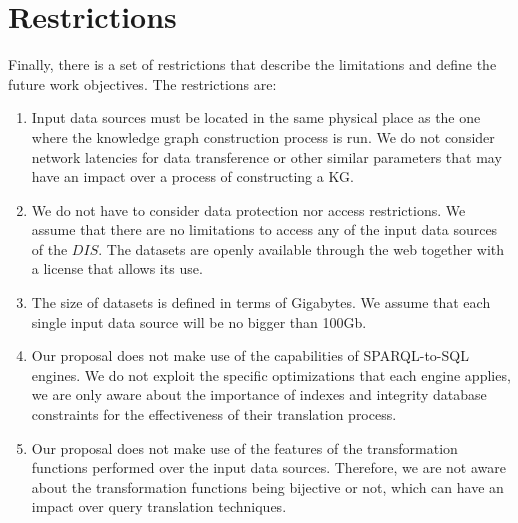 \section{Restrictions}
Finally, there is a set of restrictions that describe the limitations and define the future work objectives. The restrictions are:

\begin{enumerate}[label=\textbf{R{\arabic*}}]
    \item Input data sources must be located in the same physical place as the one where the knowledge graph construction process is run. We do not consider network latencies for data transference or other similar parameters that may have an impact over a process of constructing a KG. 
    \item We do not have to consider data protection nor access restrictions. We assume that there are no limitations to access any of the input data sources of the $DIS$. The datasets are openly available through the web together with a license that allows its use.
    \item The size of datasets is defined in terms of Gigabytes. We assume that each single input data source will be no bigger than 100Gb.
    \item Our proposal does not make use of the capabilities of SPARQL-to-SQL engines. We do not exploit the specific optimizations that each engine applies, we are only aware about the importance of indexes and integrity database constraints for the effectiveness of their translation process.
    \item Our proposal does not make use of the features of the transformation functions performed over the input data sources. Therefore, we are not aware about  the transformation functions being bijective or not, which can have an impact over query translation techniques.  
\end{enumerate}



